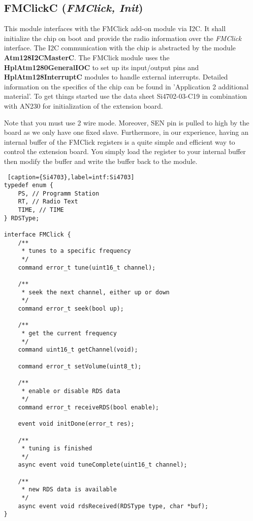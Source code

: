 \documentclass[a4paper,10pt]{article}
\newcommand{\module}[1]{\textbf{#1}}
\def\interface#1{{\em #1\/}}
\begin{document}
\subsection{FMClickC (\interface{FMClick, Init})}

This module interfaces with the FMClick add-on module
	via I2C.
It shall initialize the chip on boot and provide the radio information
	over the \interface{FMClick} interface.
The I2C communication with the chip is abstracted by the module
	\module{Atm128I2CMasterC}.
The FMClick module uses the \module{HplAtm1280GeneralIOC} to set up its input/output pins and
	\module{HplAtm128InterruptC} modules to handle external interrupts.
Detailed information on the specifics of the chip can be found in
	'Application 2 additional material'.
To get things started use the data sheet Si4702-03-C19 in combination with AN230 for initialization of the extension board.

Note that you must use 2 wire mode. Moreover, SEN pin is pulled to high by the board as we only have one fixed slave.
Furthermore, in our experience, having an internal buffer of the FMClick registers is a quite simple and efficient way to control the extension board. You simply load the register to your internal buffer then modify the buffer and write the buffer back to the module. 

\begin{lstlisting} [caption={Si4703},label=intf:Si4703]
typedef enum {
    PS, // Programm Station
    RT, // Radio Text
    TIME, // TIME
} RDSType;

interface FMClick {
    /**
     * tunes to a specific frequency
     */
    command error_t tune(uint16_t channel);

    /**
     * seek the next channel, either up or down
     */
    command error_t seek(bool up);

    /**
     * get the current frequency
     */
    command uint16_t getChannel(void);

    command error_t setVolume(uint8_t);

    /**
     * enable or disable RDS data
     */
    command error_t receiveRDS(bool enable);

    event void initDone(error_t res);

    /**
     * tuning is finished
     */
    async event void tuneComplete(uint16_t channel);

    /**
     * new RDS data is available
     */
    async event void rdsReceived(RDSType type, char *buf);
}
\end{lstlisting}
\end{document}
